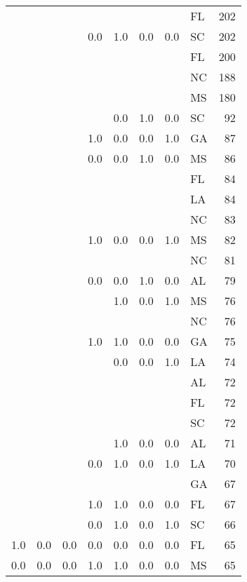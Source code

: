 \begin{tabular}{llllllllr}
    &     &     &     &     &     &     & FL &   202 \\
    &     &     & 0.0 & 1.0 & 0.0 & 0.0 & SC &   202 \\
    &     &     &     &     &     &     & FL &   200 \\
    &     &     &     &     &     &     & NC &   188 \\
    &     &     &     &     &     &     & MS &   180 \\
    &     &     &     & 0.0 & 1.0 & 0.0 & SC &    92 \\
    &     &     & 1.0 & 0.0 & 0.0 & 1.0 & GA &    87 \\
    &     &     & 0.0 & 0.0 & 1.0 & 0.0 & MS &    86 \\
    &     &     &     &     &     &     & FL &    84 \\
    &     &     &     &     &     &     & LA &    84 \\
    &     &     &     &     &     &     & NC &    83 \\
    &     &     & 1.0 & 0.0 & 0.0 & 1.0 & MS &    82 \\
    &     &     &     &     &     &     & NC &    81 \\
    &     &     & 0.0 & 0.0 & 1.0 & 0.0 & AL &    79 \\
    &     &     &     & 1.0 & 0.0 & 1.0 & MS &    76 \\
    &     &     &     &     &     &     & NC &    76 \\
    &     &     & 1.0 & 1.0 & 0.0 & 0.0 & GA &    75 \\
    &     &     &     & 0.0 & 0.0 & 1.0 & LA &    74 \\
    &     &     &     &     &     &     & AL &    72 \\
    &     &     &     &     &     &     & FL &    72 \\
    &     &     &     &     &     &     & SC &    72 \\
    &     &     &     & 1.0 & 0.0 & 0.0 & AL &    71 \\
    &     &     & 0.0 & 1.0 & 0.0 & 1.0 & LA &    70 \\
    &     &     &     &     &     &     & GA &    67 \\
    &     &     & 1.0 & 1.0 & 0.0 & 0.0 & FL &    67 \\
    &     &     & 0.0 & 1.0 & 0.0 & 1.0 & SC &    66 \\
1.0 & 0.0 & 0.0 & 0.0 & 0.0 & 0.0 & 0.0 & FL &    65 \\
0.0 & 0.0 & 0.0 & 1.0 & 1.0 & 0.0 & 0.0 & MS &    65 \\

\end{tabular}

